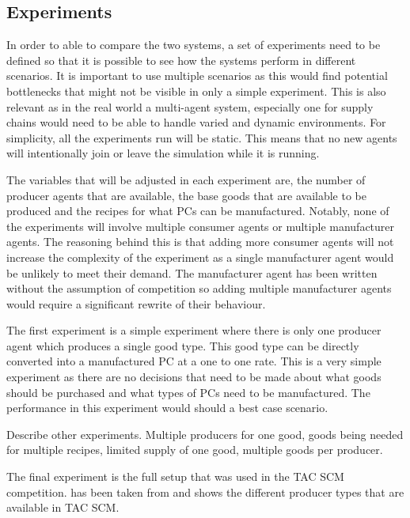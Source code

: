 \subsection{Experiments}

In order to able to compare the two systems, a set of experiments need to be defined so that it is possible to see how the systems perform in different scenarios.
It is important to use multiple scenarios as this would find potential bottlenecks that might not be visible in only a simple experiment.
This is also relevant as in the real world a multi-agent system, especially one for supply chains would need to be able to handle varied and dynamic environments.
For simplicity, all the experiments run will be static.
This means that no new agents will intentionally join or leave the simulation while it is running.

The variables that will be adjusted in each experiment are, the number of producer agents that are available, the base goods that are available to be produced and the recipes for what PCs can be manufactured.
Notably, none of the experiments will involve multiple consumer agents or multiple manufacturer agents.
The reasoning behind this is that adding more consumer agents will not increase the complexity of the experiment as a single manufacturer agent would be unlikely to meet their demand.
The manufacturer agent has been written without the assumption of competition so adding multiple manufacturer agents would require a significant rewrite of their behaviour.

The first experiment is a simple experiment where there is only one producer agent which produces a single good type.
This good type can be directly converted into a manufactured PC at a one to one rate.
This is a very simple experiment as there are no decisions that need to be made about what goods should be purchased and what types of PCs need to be manufactured.
The performance in this experiment would should a best case scenario.

Describe other experiments.
Multiple producers for one good, goods being needed for multiple recipes, limited supply of one good, multiple goods per producer.

The final experiment is the full setup that was used in the TAC SCM competition.
 has been taken from  and shows the different producer types that are available in TAC SCM\@.


